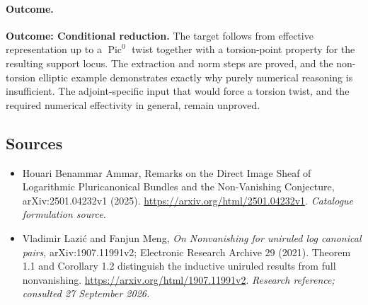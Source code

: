 \documentclass[11pt,a4paper]{article}
\numberwithin{equation}{section}
\begin{document}
\paragraph{Outcome.}
\textbf{Outcome: Conditional reduction.}
The target follows from effective representation up to a $\operatorname{Pic}^0$ twist together with a torsion-point property for the resulting support locus. The extraction and norm steps are proved, and the non-torsion elliptic example demonstrates exactly why purely numerical reasoning is insufficient. The adjoint-specific input that would force a torsion twist, and the required numerical effectivity in general, remain unproved.

\subsection{Sources}
\begin{itemize}\raggedright
\item[\textnormal{[S1]}]\hypertarget{source:statement:1}{} Houari Benammar Ammar, Remarks on the Direct Image Sheaf of Logarithmic Pluricanonical Bundles and the Non-Vanishing Conjecture, arXiv:2501.04232v1 (2025).
\url{https://arxiv.org/html/2501.04232v1}.
{\small\textit{Catalogue formulation source.}}
\item[\textnormal{[E1]}]\hypertarget{extra:statement:1}{} Vladimir Lazi\'c and Fanjun Meng, \emph{On Nonvanishing for uniruled log canonical pairs}, arXiv:1907.11991v2; Electronic Research Archive 29 (2021). Theorem 1.1 and Corollary 1.2 distinguish the inductive uniruled results from full nonvanishing.
\url{https://arxiv.org/html/1907.11991v2}.
{\small\textit{Research reference; consulted 27 September 2026.}}
\end{itemize}
\end{document}
